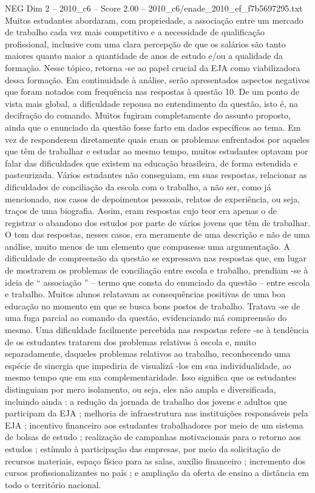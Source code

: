 \begin{textsample}{NEG Dim 2 – 2010\_c6 – Score 2.00 – 2010\_c6/enade\_2010\_ef\_f7b5697295.txt}
Muitos estudantes abordaram, com propriedade, a associação entre um mercado de trabalho cada vez mais competitivo e a necessidade de qualificação profissional, inclusive com uma clara percepção de que os salários são tanto maiores quanto maior a quantidade de anos de estudo e/ou a qualidade da formação.
Nesse tópico, retorna -se ao papel crucial da EJA como viabilizadora dessa formação.
Em continuidade à análise, serão apresentados aspectos negativos que foram notados com frequência nas respostas à questão 10.
De um ponto de vista mais global, a dificuldade repousa no entendimento da questão, isto é, na decifração do comando.
Muitos fugiram completamente do assunto proposto, ainda que o enunciado da questão fosse farto em dados específicos ao tema.
Em vez de responderem diretamente quais eram os problemas enfrentados por aqueles que têm de trabalhar e estudar ao mesmo tempo, muitos estudantes optavam por falar das dificuldades que existem na educação brasileira, de forma estendida e pasteurizada.
Vários estudantes não conseguiam, em suas respostas, relacionar as dificuldades de conciliação da escola com o trabalho, a não ser, como já mencionado, nos casos de depoimentos pessoais, relatos de experiência, ou seja, traços de uma biografia.
Assim, eram respostas cujo teor era apenas o de registrar o abandono dos estudos por parte de vários jovens que têm de trabalhar.
O tom das respostas, nesses casos, era meramente de uma descrição e não de uma análise, muito menos de um elemento que compusesse uma argumentação.
A dificuldade de compreensão da questão se expressava nas respostas que, em lugar de mostrarem os problemas de conciliação entre escola e trabalho, prendiam -se à ideia de “ associação ” – termo que consta do enunciado da questão – entre escola e trabalho.
Muitos alunos relatavam as consequências positivas de uma boa educação no momento em que se busca bons postos de trabalho.
Tratava -se de uma fuga parcial ao comando da questão, evidenciando má compreensão do mesmo.
Uma dificuldade facilmente percebida nas respostas refere -se à tendência de os estudantes tratarem dos problemas relativos à escola e, muito separadamente, daqueles problemas relativos ao trabalho, reconhecendo uma espécie de sinergia que impediria de visualizá -los em sua individualidade, ao mesmo tempo que em sua complementaridade.
Isso significa que os estudantes distinguiam por mero isolamento, ou seja, eles não ampla e diversificada, incluindo ainda : a redução da jornada de trabalho dos jovens e adultos que participam da EJA ; melhoria de infraestrutura nas instituições responsáveis pela EJA ; incentivo financeiro aos estudantes trabalhadores por meio de um sistema de bolsas de estudo ; realização de campanhas motivacionais para o retorno aos estudos ; estímulo à participação das empresas, por meio da solicitação de recursos materiais, espaço físico para as salas, auxílio financeiro ; incremento dos cursos profissionalizantes no país ; e ampliação da oferta de ensino a distância em todo o território nacional.

\end{textsample}
